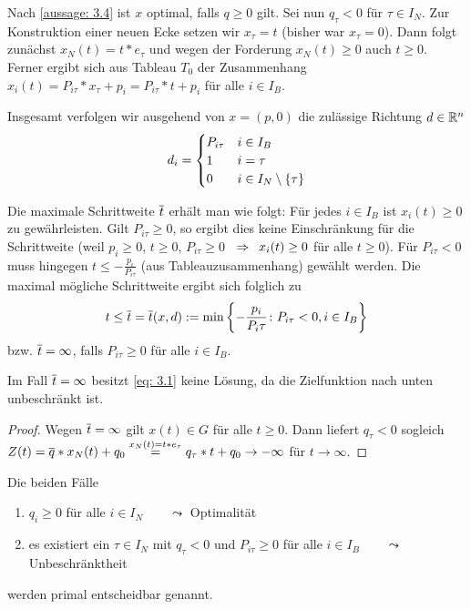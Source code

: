 Nach \cref{aussage: 3.4} ist $x$ optimal, falls $q \ge 0$ gilt. Sei nun $q_\tau < 0$ für $\tau \in I_N$. Zur Konstruktion einer neuen Ecke setzen wir $x_\tau = t$ (bisher war $x_\tau = 0$). Dann folgt zunächst $x_N(t) = t * e_\tau$ und wegen der Forderung $x_N(t) \ge 0$ auch $t \ge 0$. Ferner ergibt sich aus Tableau $T_0$ der Zusammenhang $x_i(t) = P_{i \tau} * x_\tau + p_i = P_{i \tau} * t + p_i$ für alle $i \in I_B$.

Insgesamt verfolgen wir ausgehend von $x =(p,0)$ die zulässige Richtung $d \in \mathbb{R}^n$
\begin{equation*}
	d_i = \begin{cases}
	P_{i \tau} & i \in I_B \\
	1 & i = \tau \\
	0 & i \in I_N \setminus \left\{ \tau \right\}
\end{cases}
\end{equation*}

Die maximale Schrittweite $\overline{t}$ erhält man wie folgt: Für jedes $i \in I_B$ ist $x_i(t) \ge 0$ zu gewährleisten. Gilt $P_{i \tau} \ge 0$, so ergibt dies keine Einschränkung für die Schrittweite (weil $p_i \ge 0$, $t \ge 0$, $P_{i \tau} \ge 0$ $\enskip \Rightarrow \enskip x_i(t) \ge 0$ für alle $t \ge 0$). Für $P_{i \tau} < 0$ muss hingegen $t \le - \frac{p_i}{P_{i \tau}}$ (aus Tableauzusammenhang) gewählt werden. Die maximal mögliche Schrittweite ergibt sich folglich zu
\begin{equation}
t \le \overline{t} = \overline{t}(x,d) \mathrel{:=} \min\left\{ - \frac{p_i}{P_i \tau} \colon P_{i \tau} < 0, i \in I_B \right\}
\label{eq: 3.6}
\end{equation}
bzw. $\overline{t} = \infty$, falls $P_{i \tau} \ge 0$ für alle $i \in I_B$.

\begin{aussage} %
	Im Fall $\overline{t} = \infty$ besitzt \eqref{eq: 3.1} keine Lösung, da die Zielfunktion nach unten unbeschränkt ist.
\end{aussage}
\begin{proof}
	Wegen $\overline{t} = \infty$ gilt $x(t) \in G$ für alle $t \ge 0$. Dann liefert $q_\tau < 0$ sogleich $Z(t) = \overline{q} * x_N(t) + q_0 \overset{x_N(t) = t * e_\tau}{=} q_\tau * t + q_0 \to - \infty$ für $t \to \infty$.
\end{proof}

\begin{bemerkung} %
	Die beiden Fälle 
	\begin{enumerate}[nolistsep, topsep=-\parskip]
		\item $q_i \ge 0$ für alle $i \in I_N \qquad \leadsto$ Optimalität
		\item es existiert ein $\tau \in I_N$ mit $q_\tau < 0$ und $P_{i \tau} \ge 0$ für alle $i \in I_B \qquad \leadsto$ Unbeschränktheit
	\end{enumerate}
	werden primal entscheidbar genannt.
\end{bemerkung}